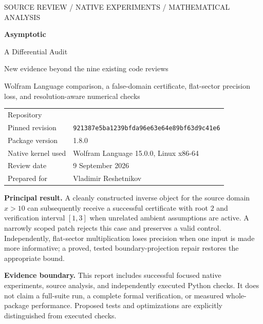 \documentclass[11pt,letterpaper]{article}
\newcommand{\code}[1]{\texttt{\detokenize{#1}}}
\newcommand{\SHA}{921387e5ba1239bfda96e63e64e89bf63d9c41e6}
\begin{document}
\begin{titlepage}
\thispagestyle{empty}
\vspace*{0.65in}
{\sffamily\large\color{ink} SOURCE REVIEW / NATIVE EXPERIMENTS / MATHEMATICAL ANALYSIS}\par
\vspace{0.3in}
{\sffamily\bfseries\Huge Asymptotic}\par
\vspace{0.14in}
{\sffamily\LARGE A Differential Audit}\par
\vspace{0.18in}
{\Large New evidence beyond the nine existing code reviews}\par
\vspace{0.4in}
{\large Wolfram Language comparison, a false-domain certificate,
flat-sector precision loss, and resolution-aware numerical checks}\par
\vspace{0.35in}
\begin{tabular}{@{}ll@{}}
Repository & \code{VladimirReshetnikov/Asymptotic}\\
Pinned revision & \texttt{\SHA}\\
Package version & 1.8.0\\
Native kernel used & Wolfram Language 15.0.0, Linux x86-64\\
Review date & 9 September 2026\\
Prepared for & Vladimir Reshetnikov
\end{tabular}
\vfill
\begin{minipage}{0.96\linewidth}
\textbf{Principal result.} A cleanly constructed inverse object for the source
domain $x>10$ can subsequently receive a successful certificate with root
$2$ and verification interval $[1,3]$ when unrelated ambient assumptions
are active. A narrowly scoped patch rejects this case and preserves a valid
control. Independently, flat-sector multiplication loses precision when one
input is made more informative; a proved, tested boundary-projection repair
restores the appropriate bound.

\textbf{Evidence boundary.} This report includes successful focused native
experiments, source analysis, and independently executed Python checks.
It does not claim a full-suite run, a complete formal verification, or measured
whole-package performance. Proposed tests and optimizations are explicitly
distinguished from executed checks.
\end{minipage}
\end{titlepage}
\end{document}
